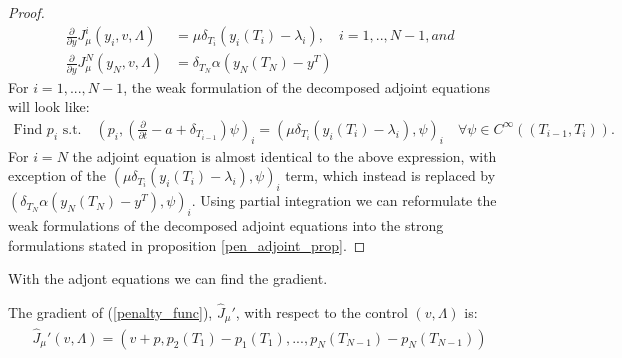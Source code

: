 \begin{proof}
\begin{align*}
\frac{\partial}{\partial y}J_{\mu}^i(y_i,v,\Lambda) &= \mu\delta_{T_i}(y_i(T_i)-\lambda_i),\quad i=1,..,N-1, and \\
\frac{\partial}{\partial y}J_{\mu}^N(y_N,v,\Lambda) &= \delta_{T_N}\alpha(y_N(T_N)-y^T)
\end{align*}
For $i=1,...,N-1$, the weak formulation of the decomposed adjoint equations will look like:
\begin{align*}
\textrm{Find $p_i$ s.t.}\quad (p_i,(\frac{\partial}{\partial t}-a+\delta_{T_{i-1}})\psi)_i =(\mu\delta_{T_i}(y_i(T_i)-\lambda_i),\psi)_i \quad \forall \psi\in C^{\infty}((T_{i-1},T_i)).
\end{align*}
For $i=N$ the adjoint equation is almost identical to the above expression, with exception of the $(\mu\delta_{T_i}(y_i(T_i)-\lambda_i),\psi)_i$ term, which instead is replaced by $(\delta_{T_N}\alpha(y_N(T_N)-y^T),\psi)_i$. Using partial integration we can reformulate the weak formulations of the decomposed adjoint equations into the strong formulations stated in proposition \ref{pen_adjoint_prop}.
\end{proof}
\noindent
With the adjont equations we can find the gradient.
\begin{proposition} \label{penGrad_prop}
The gradient of (\ref{penalty_func}), $\hat J_{\mu}'$, with respect to the control $(v,\Lambda)$ is:
\begin{align}
\hat J_{\mu}'(v,\Lambda) = (v+p,p_{2}(T_1) -p_{1}(T_1),..., p_{N}(T_{N-1}) -p_{N}(T_{N-1})) \label{penalty grad}
\end{align}
\end{proposition}
